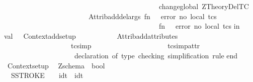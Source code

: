 \begin{isabellebody}
\ \ \ \ \ \ \ \ \ \ \ \ \ \ \ \ \ \ \ \ \ \ \ \ \ \ \ \ \ \ \ \ \ \ \ \ \ \ \ \ \ \ \ \ {\isacharparenleft}change{\isacharunderscore}global\ ZTheory{\isachardot}Del{\isacharunderscore}TC{\isacharparenright}{\isacharcomma}\isanewline
\ \ \ \ \ \ \ \ \ \ \ \ \ \ \ \ \ \ \ \ \ \ \ \ Attrib{\isachardot}add{\isacharunderscore}del{\isacharunderscore}args\ {\isacharparenleft}fn\ {\isacharunderscore}\ {\isacharequal}{\isachargreater}\ error\ {\isacharparenleft}{\isachardoublequote}no\ local\ tc{\isacharprime}s{\isacharbang}{\isachardoublequote}{\isacharparenright}{\isacharparenright}\isanewline
\ \ \ \ \ \ \ \ \ \ \ \ \ \ \ \ \ \ \ \ \ \ \ \ \ \ \ \ \ \ \ \ \ \ \ \ \ \ \ \ \ \ \ \ {\isacharparenleft}fn\ {\isacharunderscore}\ {\isacharequal}{\isachargreater}\ error\ {\isacharparenleft}{\isachardoublequote}no\ local\ tc{\isacharprime}s{\isacharbang}{\isachardoublequote}{\isacharparenright}{\isacharparenright}{\isacharparenright}{\isacharsemicolon}\isanewline
in\isanewline
val\ {\isacharunderscore}\ {\isacharequal}\ Context{\isachardot}add{\isacharunderscore}setup\isanewline
\ \ \ \ \ \ \ \ \ \ \ {\isacharbrackleft}Attrib{\isachardot}add{\isacharunderscore}attributes\isanewline
\ \ \ \ \ \ \ \ \ \ \ \ \ \ \ \ \ \ \ {\isacharbrackleft}{\isacharparenleft}{\isachardoublequote}tc{\isacharunderscore}simp{\isachardoublequote}{\isacharcomma}\ \isanewline
\ \ \ \ \ \ \ \ \ \ \ \ \ \ \ \ \ \ \ \ tc{\isacharunderscore}simp{\isacharunderscore}attr{\isacharcomma}\ \isanewline
\ \ \ \ \ \ \ \ \ \ \ \ \ \ \ \ \ \ \ \ {\isachardoublequote}declaration\ of\ type\ checking\ simplification\ rule{\isachardoublequote}{\isacharparenright}{\isacharbrackright}{\isacharbrackright}\isanewline
\isanewline
end{\isacharsemicolon}\isanewline
{\isacharverbatimclose}\isanewline
\isanewline
\isanewline
{}\isamarkupfalse%
\ {\isachardoublequoteopen}Context{\isachardot}setup\ {\isacharparenleft}{\isacharparenright}{\isachardoublequoteclose}%
\endisatagML
{\isafoldML}%
%
\isadelimML
%
\endisadelimML
%
\isamarkuptrue%
\isamarkupfalse%
\ Zschema\ {\isacharequal}\ bool\ \ \ \ \ \ \ \ \isanewline
\isanewline
\isanewline
\isanewline
\isanewline
\isanewline
\isanewline
\isanewline
\isanewline
\ \isanewline
\isanewline
{}\isamarkupfalse%
\isanewline
\isanewline
\ \ \isanewline
\ \ SSTROKE\ \ \ {\isacharcolon}{\isacharcolon}\ {\isachardoublequoteopen}idt\ {\isacharequal}{\isachargreater}\ idt{\isachardoublequoteclose}\ \ \ \ \ \ \ \ \ \ {\isacharparenleft}{\isachardoublequoteopen}{\isacharunderscore}{\isacharprime}{\isacharbackquote}{\isachardoublequoteclose}{\isacharparenright}\ \isanewline

\end{isabellebody}
